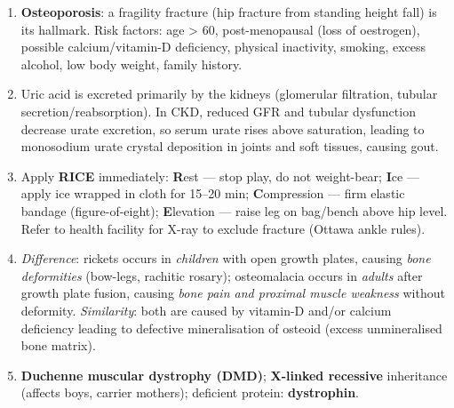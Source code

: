 \documentclass[11pt]{article}
\begin{document}
\begin{corrige}[Exercise 1]
\begin{enumerate}
\item \textbf{Osteoporosis}: a fragility fracture (hip fracture from standing height fall) is its hallmark. Risk factors: age > 60, post-menopausal (loss of oestrogen), possible calcium/vitamin-D deficiency, physical inactivity, smoking, excess alcohol, low body weight, family history.
\item Uric acid is excreted primarily by the kidneys (glomerular filtration, tubular secretion/reabsorption). In CKD, reduced GFR and tubular dysfunction decrease urate excretion, so serum urate rises above saturation, leading to monosodium urate crystal deposition in joints and soft tissues, causing gout.
\item Apply \textbf{RICE} immediately: \textbf{R}est — stop play, do not weight-bear; \textbf{I}ce — apply ice wrapped in cloth for 15--20 min; \textbf{C}ompression — firm elastic bandage (figure-of-eight); \textbf{E}levation — raise leg on bag/bench above hip level. Refer to health facility for X-ray to exclude fracture (Ottawa ankle rules).
\item \emph{Difference}: rickets occurs in \emph{children} with open growth plates, causing \emph{bone deformities} (bow-legs, rachitic rosary); osteomalacia occurs in \emph{adults} after growth plate fusion, causing \emph{bone pain and proximal muscle weakness} without deformity. \emph{Similarity}: both are caused by vitamin-D and/or calcium deficiency leading to defective mineralisation of osteoid (excess unmineralised bone matrix).
\item \textbf{Duchenne muscular dystrophy (DMD)}; \textbf{X-linked recessive} inheritance (affects boys, carrier mothers); deficient protein: \textbf{dystrophin}.
\end{enumerate}
\end{corrige}
\end{document}
